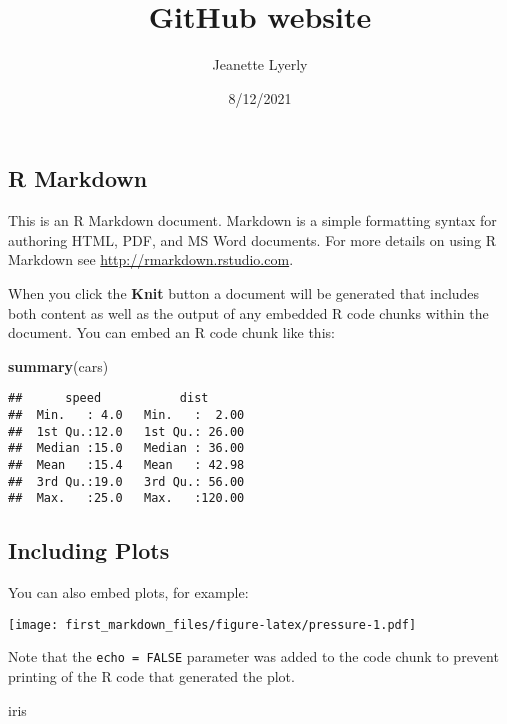 \documentclass[]{article}
\title{GitHub website}
\author{Jeanette Lyerly}
\date{8/12/2021}
\newenvironment{Shaded}{\begin{snugshade}}{\end{snugshade}}
\newcommand{\KeywordTok}[1]{\textcolor[rgb]{0.13,0.29,0.53}{\textbf{#1}}}
\newcommand{\NormalTok}[1]{#1}
\begin{document}
\maketitle

\hypertarget{r-markdown}{%
\subsection{R Markdown}\label{r-markdown}}

This is an R Markdown document. Markdown is a simple formatting syntax
for authoring HTML, PDF, and MS Word documents. For more details on
using R Markdown see \url{http://rmarkdown.rstudio.com}.

When you click the \textbf{Knit} button a document will be generated
that includes both content as well as the output of any embedded R code
chunks within the document. You can embed an R code chunk like this:

\begin{Shaded}
\begin{Highlighting}[]
\KeywordTok{summary}\NormalTok{(cars)}
\end{Highlighting}
\end{Shaded}

\begin{verbatim}
##      speed           dist       
##  Min.   : 4.0   Min.   :  2.00  
##  1st Qu.:12.0   1st Qu.: 26.00  
##  Median :15.0   Median : 36.00  
##  Mean   :15.4   Mean   : 42.98  
##  3rd Qu.:19.0   3rd Qu.: 56.00  
##  Max.   :25.0   Max.   :120.00
\end{verbatim}

\hypertarget{including-plots}{%
\subsection{Including Plots}\label{including-plots}}

You can also embed plots, for example:

\texttt{[image: first\_markdown\_files/figure-latex/pressure-1.pdf]}

Note that the \texttt{echo\ =\ FALSE} parameter was added to the code
chunk to prevent printing of the R code that generated the plot.

\begin{Shaded}
\begin{Highlighting}[]
\NormalTok{iris}
\end{Highlighting}
\end{Shaded}
\end{document}
